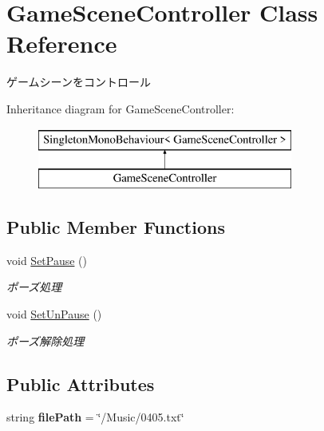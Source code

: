 \hypertarget{class_game_scene_controller}{}\section{Game\+Scene\+Controller Class Reference}
\label{class_game_scene_controller}


ゲームシーンをコントロール  


Inheritance diagram for Game\+Scene\+Controller\+:\begin{figure}[H]
\begin{center}
\leavevmode
\includegraphics[height=2.000000cm]{class_game_scene_controller}
\end{center}
\end{figure}
\subsection*{Public Member Functions}
\begin{DoxyCompactItemize}
\item 
void \hyperlink{class_game_scene_controller_a011817ccbd771348e030649cda716168}{Set\+Pause} ()
\begin{DoxyCompactList}\small\item\em ポーズ処理 \end{DoxyCompactList}\item 
void \hyperlink{class_game_scene_controller_abdb3f81215251f33d62868fd089499c7}{Set\+Un\+Pause} ()
\begin{DoxyCompactList}\small\item\em ポーズ解除処理 \end{DoxyCompactList}\end{DoxyCompactItemize}
\subsection*{Public Attributes}
\begin{DoxyCompactItemize}
\item 
string {\bfseries file\+Path} = \char`\"{}/Music/0405.txt\char`\"{}\hypertarget{class_game_scene_controller_a7b2384e203698f395ed8e42ca79aaa4c}{}\label{class_game_scene_controller_a7b2384e203698f395ed8e42ca79aaa4c}

\end{DoxyCompactItemize}
